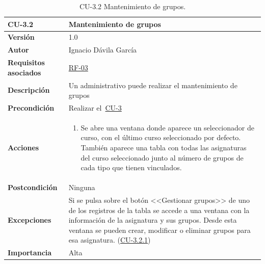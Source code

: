 \begin{table}[p]
\label{table:CU-3.2}
	\centering
	\begin{tabularx}{\linewidth}{ p{} p{} }
		\toprule
		\textbf{CU-3.2}    & \textbf{Mantenimiento de grupos}\\
		\toprule
		\textbf{Versión}              & 1.0    \\
		\textbf{Autor}                & Ignacio Dávila García \\
		\textbf{Requisitos asociados} & \hyperref[itm:RF3]{RF-03} \\
		\textbf{Descripción}          & Un administrativo puede realizar el mantenimiento de grupos \\
		\textbf{Precondición}         & Realizar el~\hyperref[table:CU-3]{CU-3} \\
		\textbf{Acciones}             &
		\begin{enumerate}
			\def\labelenumi{\arabic{enumi}.}
			\tightlist
			\item Se abre una ventana donde aparece un seleccionador de curso, con el último curso seleccionado por defecto. También aparece una tabla con todas las asignaturas del curso seleccionado junto al número de grupos de cada tipo que tienen vinculados.
		\end{enumerate}\\
		\textbf{Postcondición}        & Ninguna \\
		\textbf{Excepciones}          & Si se pulsa sobre el botón <<Gestionar grupos>> de uno de los registros de la tabla se accede a una ventana con la información de la asignatura y sus grupos. Desde esta ventana se pueden crear, modificar o eliminar grupos para esa asignatura. (\hyperref[table:CU-3.2.1]{CU-3.2.1}) \\
		\textbf{Importancia}          & Alta \\
		\bottomrule
	\end{tabularx}
	\caption{CU-3.2 Mantenimiento de grupos.}
\end{table}
\FloatBarrier


